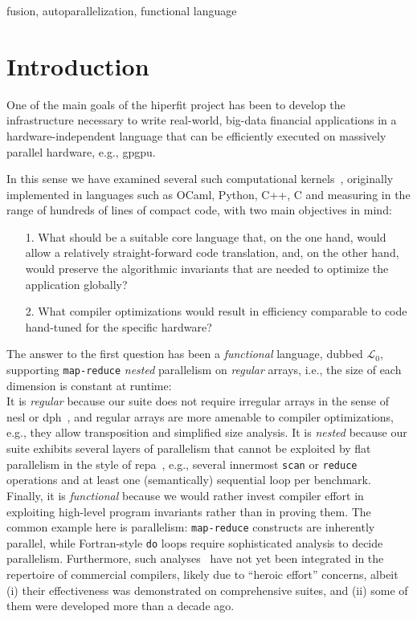 \documentclass{sigplanconf}  %
\newcommand{\LO}{$\mathcal{L}_0$}
\begin{document}
\keywords
fusion, autoparallelization, functional language

\section{Introduction}
\label{sec:Introduction}

One of the main goals of the {\sc hiperfit} project has been to
develop the infrastructure necessary to write real-world, big-data 
financial applications in a hardware-independent language that can 
be efficiently executed on massively parallel hardware, e.g., {\sc gpgpu}.  

In this sense we have examined several such computational kernels~\cite{LexiFiPricing}, 
originally implemented in languages such as OCaml, Python, C++, C
and measuring in the range of hundreds of lines of compact code, 
with two main objectives in mind: 
\begin{itemize}
    \item[1.] What should be a suitable core language that, on the
                one hand, would allow a relatively straight-forward 
                code translation, and, on the other hand, would
                preserve the algorithmic invariants that are needed
                to optimize the application globally?

    \item[2.] What compiler optimizations would result in
                efficiency comparable to code hand-tuned for the specific hardware?
\end{itemize}

The answer to the first question has been %
a {\em functional} language, dubbed \LO{}, supporting %
\texttt{map-reduce} {\em nested} parallelism on {\em regular} arrays, i.e., 
the size of each dimension is constant at runtime:\\
It is {\em regular} because our suite does not require irregular 
arrays in the sense of {\sc nesl} or {\sc dph}~\cite{BlellochCACM96NESL,Chak06DPH},
and regular arrays are more amenable to compiler optimizations,
e.g., they allow transposition and simplified size analysis. 
%
It is {\em nested} because our suite exhibits several layers of 
parallelism that cannot be exploited by flat parallelism in the style of 
{\sc repa}~\cite{keller2010regular}, e.g., several innermost {\tt scan} or 
{\tt reduce} operations and at least one (semantically)
sequential loop per benchmark.
%
Finally, it is {\em functional} because we would rather invest compiler effort
in exploiting high-level program invariants rather than in proving them.
The common example here is parallelism: {\tt map-reduce} 
constructs are inherently parallel, while Fortran-style \texttt{do} 
loops require sophisticated analysis to decide parallelism. 
Furthermore, such analyses~\cite{Blume94RangeTest,SUIF,CosPLDI,SummaryMonot} 
have not yet been integrated in the repertoire of commercial compilers,
likely due to ``heroic effort'' concerns, albeit
 (i) their effectiveness was demonstrated on comprehensive suites, and
(ii) some of them were developed more than a decade ago.
\end{document}
